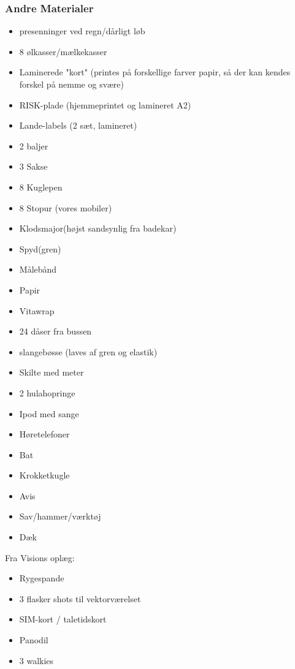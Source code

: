 \subsubsection*{Andre Materialer}
\begin{itemize}
  \item presenninger ved regn/dårligt løb
  \item 8 ølkasser/mælkekasser
  \item Laminerede "kort" (printes på forskellige farver papir, så der kan kendes forskel på nemme og svære)
  \item RISK-plade (hjemmeprintet og lamineret A2)
  \item Lande-labels (2 sæt, lamineret)
  \item 2 baljer
  \item 3 Sakse
  \item 8 Kuglepen
  \item 8 Stopur (vores mobiler)
  \item Klodsmajor(højst sandsynlig fra badekar)
  \item Spyd(gren)
  \item Målebånd
  \item Papir
  \item Vitawrap
  \item 24 dåser fra bussen
  \item slangebøsse (laves af gren og elastik)
  \item Skilte med meter
  \item 2 hulahopringe
  \item Ipod med sange
  \item Høretelefoner
  \item Bat
  \item Krokketkugle
  \item Avis
  \item Sav/hammer/værktøj
  \item Dæk \Stive
\end{itemize}


Fra Visions oplæg:
\begin{itemize}
  \item Rygespande
  \item 3 flasker shots til vektorværelset
  \item SIM-kort / taletidskort
  \item Panodil
  \item 3 walkies
\end{itemize}
